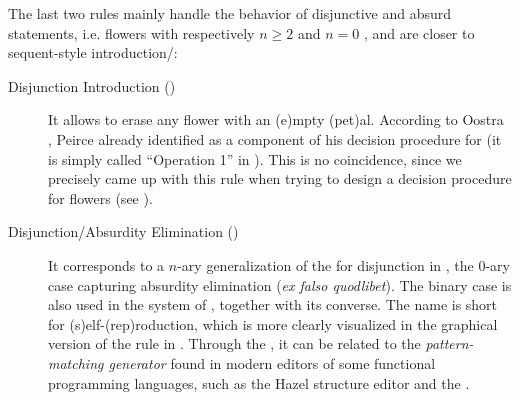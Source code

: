 \begin{scope}
The last two rules mainly handle the behavior of disjunctive and absurd
statements, i.e. flowers with respectively $n \geq 2$ and $n = 0$ , and
are closer to sequent-style introduction/:

\begin{description}
  \item[Disjunction Introduction ()]
    It allows to erase any flower with an \textsf{(e)}mpty \textsf{(pet)}al.
    According to Oostra \cite[p.~109]{oostra_advances_2022}, Peirce already
    identified  as a component of his decision procedure for
     (it is simply called ``Operation 1'' in
    \cite{oostra_advances_2022}). This is no coincidence, since we precisely
    came up with this rule when trying to design a decision procedure for
    flowers (see ).

  \item[Disjunction/Absurdity Elimination ()]
    It corresponds to a $n$-ary generalization of the  for disjunction in , the $0$-ary case capturing
    absurdity elimination (\textit{ex falso quodlibet}). The binary case is also
    used in the  system of \cite{minghui_graphical_2019}, together with
    its converse. The name  is short for
    \textsf{(s)}elf-\textsf{(rep)}roduction, which is more clearly visualized in
    the graphical version of the rule in . Through the
    , it can be related to the \emph{pattern-matching
    generator} found in modern editors of some functional programming languages,
    such as the Hazel structure editor and the  
    .
\end{description}


\end{scope}
